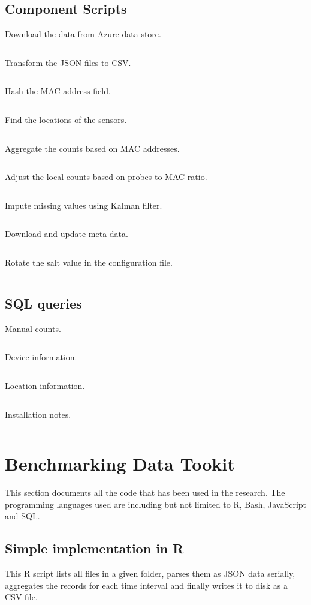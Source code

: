 \subsection{Component Scripts}
\vspace{1em}
Download the data from Azure data store.
\inputminted{bash}{tools/pipeline/scripts/download}
Transform the JSON files to CSV.
\inputminted{bash}{tools/pipeline/scripts/flatten}
Hash the MAC address field.
\inputminted{R}{tools/pipeline/scripts/hash}
Find the locations of the sensors.
\inputminted{bash}{tools/pipeline/scripts/locate}
Aggregate the counts based on MAC addresses.
\inputminted{R}{tools/pipeline/scripts/count}
Adjust the local counts based on probes to MAC ratio.
\inputminted{R}{tools/pipeline/scripts/adjust}
Impute missing values using Kalman filter.
\inputminted{R}{tools/pipeline/scripts/impute}
Download and update meta data.
\inputminted{bash}{tools/pipeline/scripts/meta_data}
Rotate the salt value in the configuration file.
\inputminted{bash}{tools/pipeline/scripts/rotate_salt}

\subsection{SQL queries}
\vspace{1em}
Manual counts.
\inputminted{sql}{tools/pipeline/queries/calibrations}
Device information.
\inputminted{sql}{tools/pipeline/queries/devices}
Location information.
\inputminted{sql}{tools/pipeline/queries/locations}
Installation notes.
\inputminted{sql}{tools/pipeline/queries/installs}

\section{Benchmarking Data Tookit} \label{appendix:benchmark}

This section documents all the code that has been used in the research.
The programming languages used are including but not limited to R, Bash, JavaScript and SQL.

\subsection{Simple implementation in R}
This R script lists all files in a given folder, parses them as JSON data serially, aggregates the records for each time interval and finally writes it to disk as a CSV file.
\vspace{1em}
\inputminted{R}{analysis/data-toolkit/old-toolkit.r}


